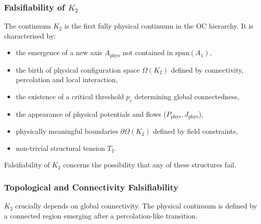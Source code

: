 
\subsubsection{Falsifiability of \texorpdfstring{$K_2$}{K_2}}
\label{sec:falsifiability-k2}

The continuum $K_2$ is the first fully physical continuum in the OC
hierarchy.  
It is characterised by:
\begin{itemize}
    \item the emergence of a new axis $A_{\mathrm{phys}}$ not contained
    in $\mathrm{span}(A_1)$,
    \item the birth of physical configuration space $\Omega(K_2)$ defined
    by connectivity, percolation and local interaction,
    \item the existence of a critical threshold $p_c$ determining global
    connectedness,
    \item the appearance of physical potentials and flows
    ($P_{\mathrm{phys}}, J_{\mathrm{phys}}$),
    \item physically meaningful boundaries $\partial\Omega(K_2)$ defined
    by field constraints,
    \item non-trivial structural tension $T_2$.
\end{itemize}

Falsifiability of $K_2$ concerns the possibility that any of these
structures fail.



\subsubsection{Topological and Connectivity Falsifiability}

$K_2$ crucially depends on global connectivity.  
The physical continuum is defined by a connected region emerging after a
percolation-like transition.

